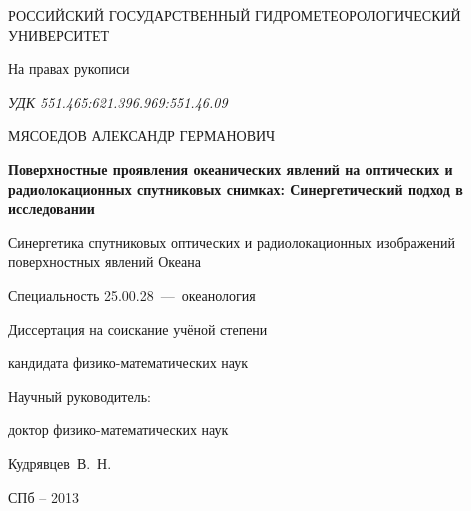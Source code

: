 \thispagestyle{empty}

\begin{center}
РОССИЙСКИЙ ГОСУДАРСТВЕННЫЙ ГИДРОМЕТЕОРОЛОГИЧЕСКИЙ УНИВЕРСИТЕТ\par
\par 
\par
\end{center}

\vspace{20mm}
\begin{flushright}
На правах рукописи

{\sl УДК 551.465:621.396.969:551.46.09}

\end{flushright}

\vspace{30mm}
\begin{center}
{\large МЯСОЕДОВ АЛЕКСАНДР ГЕРМАНОВИЧ}
\end{center}

\vspace{5mm}
\begin{center}
{\bf \large Поверхностные проявления океанических явлений на оптических и радиолокационных спутниковых снимках:
Синергетический подход в исследовании

Синергетика спутниковых оптических и радиолокационных изображений поверхностных явлений Океана
\par}

\vspace{10mm}
{%
Специальность 25.00.28~---~океанология
}

\vspace{10mm}
Диссертация на соискание учёной степени

кандидата физико-математических наук
\end{center}

\vspace{20mm}
\begin{flushright}
Научный руководитель:

доктор физико-математических наук

Кудрявцев~В.~Н.

\end{flushright}

\vspace{20mm}
\begin{center}
{СПб -- 2013}
\end{center}

\newpage